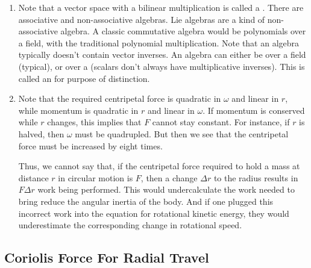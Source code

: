 \begin{enumerate}
  \item Note that a vector space with a bilinear multiplication is
  called a . There are associative and non-associative
  algebras. Lie algebras are a kind of non-associative algebra. A
  classic commutative algebra would be polynomials over a field, with
  the traditional polynomial multiplication. Note that an algebra
  typically doesn't contain vector inverses. An algebra can either be
  over a field (typical), or over a  (scalars don't always
  have multiplicative inverses). This is called an  for purpose of distinction.

  \item Note that the required centripetal force is quadratic in
  $\omega$ and linear in $r$, while momentum is quadratic in $r$ and
  linear in $\omega$. If momentum is conserved while $r$ changes, this
  implies that $F$ cannot stay constant. For instance, if $r$ is halved,
  then $\omega$ must be quadrupled. But then we see that the centripetal
  force must be increased by eight times.

  Thus, we cannot say that, if the centripetal force required to hold a
  mass at distance $r$ in circular motion is $F$, then a change $\Delta
  r$ to the radius results in $F \Delta r$ work being performed. This
  would undercalculate the work needed to bring reduce the angular
  inertia of the body. And if one plugged this incorrect work into the
  equation for rotational kinetic energy, they would underestimate the
  corresponding change in rotational speed.
\end{enumerate}

\subsection{Coriolis Force For Radial Travel}

